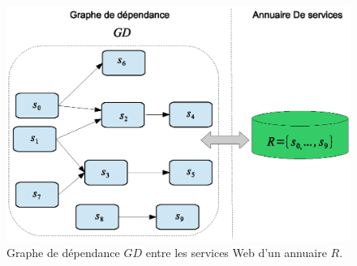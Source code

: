 \begin{figure}[h]
    \centering
    \includegraphics[width=1.2\textwidth]{figs/ch4/gd.eps}
    \caption{Graphe de dépendance $GD$ entre les services Web d'un
      annuaire $R$.}
    \label{fig:ch4/gd}
\end{figure}

